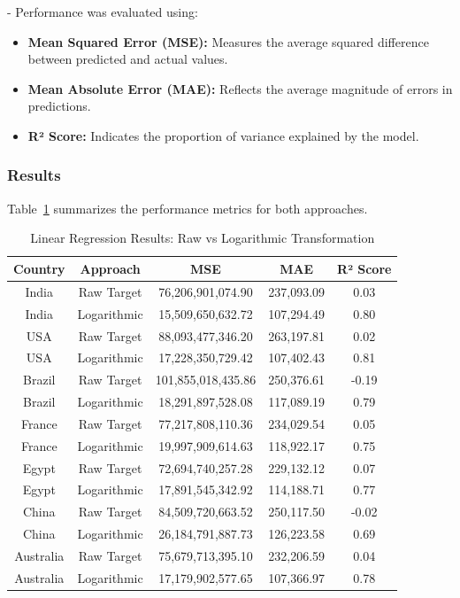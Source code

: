 \documentclass{article}
\begin{document}
- Performance was evaluated using:
\begin{itemize}
\item
\textbf{Mean Squared Error (MSE):} Measures the average squared difference between predicted and actual values.
\item
\textbf{Mean Absolute Error (MAE):} Reflects the average magnitude of errors in predictions. 
\item
\textbf{R² Score:} Indicates the proportion of variance explained by the model.
\end{itemize}


\subsubsection{Results}
Table~\ref{tab:linear_regression_results} summarizes the performance metrics for both approaches.

\begin{table}[H]
\centering
\begin{tabular}{|c|c|c|c|c|}
\hline
\textbf{Country} & \textbf{Approach} & \textbf{MSE} & \textbf{MAE} & \textbf{R² Score} \\ \hline
India & Raw Target & 76,206,901,074.90 & 237,093.09 & 0.03 \\
India & Logarithmic & 15,509,650,632.72 & 107,294.49 & 0.80 \\ \hline
USA & Raw Target & 88,093,477,346.20 & 263,197.81 & 0.02 \\
USA & Logarithmic & 17,228,350,729.42 & 107,402.43 & 0.81 \\ \hline
Brazil & Raw Target & 101,855,018,435.86 & 250,376.61 & -0.19 \\
Brazil & Logarithmic & 18,291,897,528.08 & 117,089.19 & 0.79 \\ \hline
France & Raw Target & 77,217,808,110.36 & 234,029.54 & 0.05 \\
France & Logarithmic & 19,997,909,614.63 & 118,922.17 & 0.75 \\ \hline
Egypt & Raw Target & 72,694,740,257.28 & 229,132.12 & 0.07 \\
Egypt & Logarithmic & 17,891,545,342.92 & 114,188.71 & 0.77 \\ \hline
China & Raw Target & 84,509,720,663.52 & 250,117.50 & -0.02 \\
China & Logarithmic & 26,184,791,887.73 & 126,223.58 & 0.69 \\ \hline
Australia & Raw Target & 75,679,713,395.10 & 232,206.59 & 0.04 \\
Australia & Logarithmic & 17,179,902,577.65 & 107,366.97 & 0.78 \\ \hline
\end{tabular}
\caption{Linear Regression Results: Raw vs Logarithmic Transformation}
\label{tab:linear_regression_results}
\end{table}
\end{document}
